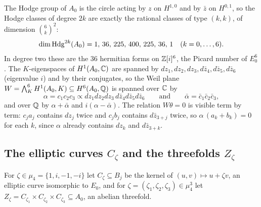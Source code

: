 The Hodge group of $A_{0}$ is the circle acting by $z$ on $H^{1,0}$ and by $\bar z$ on $H^{0,1}$, so the Hodge classes of degree $2k$ are exactly the rational classes of type $(k,k)$, of dimension $\binom{6}{k}^{2}$:
\begin{equation}\label{eq:cmdims}
\dim\mathrm{Hdg}^{2k}(A_{0})=1,\,36,\,225,\,400,\,225,\,36,\,1\quad(k=0,\dots,6).
\end{equation}
In degree two these are the $36$ hermitian forms on $\mathbb{Z}[i]^{6}$, the Picard number of $E_{0}^{6}$. The $K$-eigenspaces of $H^{1}(A_{0},\mathbb{C})$ are spanned by $dz_{1},dz_{2},dz_{3},d\bar z_{4},d\bar z_{5},d\bar z_{6}$ (eigenvalue $i$) and by their conjugates, so the Weil plane $W=\bigwedge^{6}_{K}H^{1}(A_{0},K)\subseteq H^{6}(A_{0},\mathbb{Q})$ is spanned over $\mathbb{C}$ by
\begin{equation}\label{eq:cmweil}
\alpha=c_{1}c_{2}c_{3}\propto dz_{1}dz_{2}dz_{3}\,d\bar z_{4}d\bar z_{5}d\bar z_{6}\qquad\text{and}\qquad\bar\alpha=\bar c_{1}\bar c_{2}\bar c_{3},
\end{equation}
and over $\mathbb{Q}$ by $\alpha+\bar\alpha$ and $i(\alpha-\bar\alpha)$. The relation $W\theta=0$ is visible term by term: $c_{j}a_{j}$ contains $dz_{j}$ twice and $c_{j}b_{j}$ contains $d\bar z_{3+j}$ twice, so $\alpha\,(a_{k}+b_{k})=0$ for each $k$, since $\alpha$ already contains $dz_{k}$ and $d\bar z_{3+k}$.

\subsection{The elliptic curves \texorpdfstring{$C_{\zeta}$}{C} and the threefolds \texorpdfstring{$Z_{\zeta}$}{Z}}\label{app:curves}

For $\zeta\in\mu_{4}=\{1,i,-1,-i\}$ let $C_{\zeta}\subseteq B_{j}$ be the kernel of $(u,v)\mapsto u+\zeta v$, an elliptic curve isomorphic to $E_{0}$, and for $\zeta=(\zeta_{1},\zeta_{2},\zeta_{3})\in\mu_{4}^{3}$ let $Z_{\zeta}=C_{\zeta_{1}}\times C_{\zeta_{2}}\times C_{\zeta_{3}}\subseteq A_{0}$, an abelian threefold.

